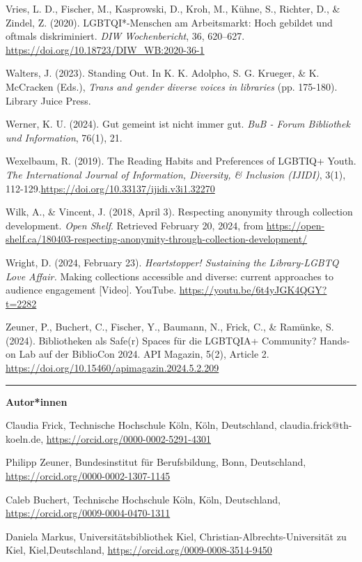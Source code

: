 \documentclass[a4paper,
fontsize=11pt,
oneside,
numbers=noperiodatend,
parskip=half-,
bibliography=totoc,
final
]{scrartcl}
\begin{document}
Vries, L. D., Fischer, M., Kasprowski, D., Kroh, M., Kühne, S., Richter,
D., \& Zindel, Z. (2020). LGBTQI*-Menschen am Arbeitsmarkt: Hoch
gebildet und oftmals diskriminiert. \emph{DIW Wochenbericht}, 36,
620--627. \url{https://doi.org/10.18723/DIW_WB:2020-36-1}

Walters, J. (2023). Standing Out. In K. K. Adolpho, S. G. Krueger, \& K.
McCracken (Eds.), \emph{Trans and gender diverse voices in libraries}
(pp. 175-180). Library Juice Press.

Werner, K. U. (2024). Gut gemeint ist nicht immer gut. \emph{BuB - Forum
Bibliothek und Information}, 76(1), 21.

Wexelbaum, R. (2019). The Reading Habits and Preferences of LGBTIQ+
Youth. \emph{The International Journal of Information, Diversity, \&
Inclusion (IJIDI)}, 3(1),
112-129.\url{https://doi.org/10.33137/ijidi.v3i1.32270}

Wilk, A., \& Vincent, J. (2018, April 3). Respecting anonymity through
collection development. \emph{Open Shelf}. Retrieved February 20, 2024,
from
\url{https://open-shelf.ca/180403-respecting-anonymity-through-collection-development/}

Wright, D. (2024, February 23). \emph{Heartstopper! Sustaining the
Library-LGBTQ Love Affair.} Making collections accessible and diverse:
current approaches to audience engagement {[}Video{]}. YouTube.
\url{https://youtu.be/6t4yJGK4QGY?t=2282}

Zeuner, P., Buchert, C., Fischer, Y., Baumann, N., Frick, C., \&
Ramünke, S. (2024). Bibliotheken als Safe(r) Spaces für die LGBTQIA+
Community? Hands-on Lab auf der BiblioCon 2024. API Magazin, 5(2),
Article 2. \url{https://doi.org/10.15460/apimagazin.2024.5.2.209}

\begin{center}\rule{0.5\linewidth}{0.5pt}\end{center}

\textbf{Autor*innen}

Claudia Frick, Technische Hochschule Köln, Köln, Deutschland, claudia.frick@th-koeln.de, \url{https://orcid.org/0000-0002-5291-4301}

Philipp Zeuner, Bundesinstitut für Berufsbildung, Bonn, Deutschland, \url{https://orcid.org/0000-0002-1307-1145}

Caleb Buchert, Technische Hochschule Köln, Köln, Deutschland, \url{https://orcid.org/0009-0004-0470-1311}

Daniela Markus, Universitätsbibliothek Kiel, Christian-Albrechts-Universität zu Kiel, Kiel,\linebreak Deutschland, \url{https://orcid.org/0009-0008-3514-9450}
\end{document}
